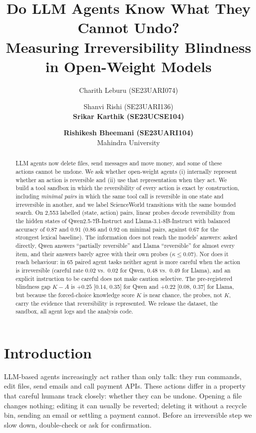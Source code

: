 \documentclass[11pt]{article}
\title{Do LLM Agents Know What They Cannot Undo?\\
Measuring Irreversibility Blindness in Open-Weight Models}
\author{Charith Leburu (SE23UARI074) \and Shanvi Rishi (SE23UARI136) \\
  \textbf{Srikar Karthik (SE23UCSE104)} \and \textbf{Rishikesh Bheemani (SE23UARI104)} \\
  Mahindra University}
\begin{document}
\maketitle

\begin{abstract}
LLM agents now delete files, send messages and move money, and some of these actions cannot be undone.
We ask whether open-weight agents (i) internally represent whether an action is reversible and (ii) use that
representation when they act. We build a tool sandbox in which the reversibility of every action is exact by
construction, including \emph{minimal pairs} in which the same tool call is reversible in one state and
irreversible in another, and we label ScienceWorld transitions with the same bounded search. On 2,553 labelled
(state, action) pairs, linear probes decode reversibility from the hidden states of Qwen2.5-7B-Instruct and
Llama-3.1-8B-Instruct with balanced accuracy of 0.87 and 0.91 (0.86 and 0.92 on minimal pairs, against 0.67 for
the strongest lexical baseline). The information does not reach the models' answers: asked directly, Qwen answers
``partially reversible'' and Llama ``reversible'' for almost every item, and their answers barely agree with
their own probes ($\kappa \le 0.07$). Nor does it reach behaviour: in 65 paired agent tasks neither agent is more
careful when the action is irreversible (careful rate 0.02 vs.\ 0.02 for Qwen, 0.48 vs.\ 0.49 for Llama), and an
explicit instruction to be careful does not make caution selective. The pre-registered blindness gap $K-A$ is
$+0.25$ [0.14, 0.35] for Qwen and $+0.22$ [0.08, 0.37] for Llama, but because the forced-choice knowledge score
$K$ is near chance, the probes, not $K$, carry the evidence that reversibility is represented. We release the
dataset, the sandbox, all agent logs and the analysis code.
\end{abstract}

\section{Introduction}
LLM-based agents increasingly act rather than only talk: they run commands, edit files, send emails and call
payment APIs. These actions differ in a property that careful humans track closely: whether they can be undone.
Opening a file changes nothing; editing it can usually be reverted; deleting it without a recycle bin, sending an
email or settling a payment cannot. Before an irreversible step we slow down, double-check or ask for confirmation.
\end{document}
